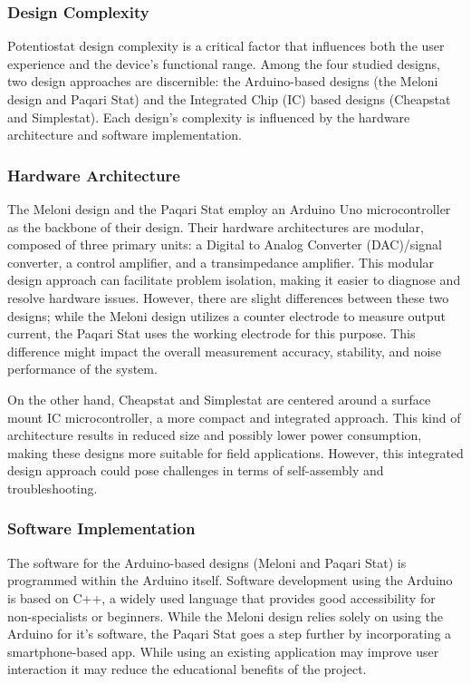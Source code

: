 \documentclass{article}
\begin{document}
\subsubsection*{Design Complexity}
Potentiostat design complexity is a critical factor that influences both the user experience and the device's functional range. Among the four studied designs, two design approaches are discernible: the Arduino-based designs (the Meloni design and Paqari Stat) and the Integrated Chip (IC) based designs (Cheapstat and Simplestat). Each design's complexity is influenced by the hardware architecture and software implementation.

\subsubsection*{Hardware Architecture}
The Meloni design and the Paqari Stat employ an Arduino Uno microcontroller as the backbone of their design. Their hardware architectures are modular, composed of three primary units: a Digital to Analog Converter (DAC)/signal converter, a control amplifier, and a transimpedance amplifier. This modular design approach can facilitate problem isolation, making it easier to diagnose and resolve hardware issues. However, there are slight differences between these two designs; while the Meloni design utilizes a counter electrode to measure output current, the Paqari Stat uses the working electrode for this purpose. This difference might impact the overall measurement accuracy, stability, and noise performance of the system. 

On the other hand, Cheapstat and Simplestat are centered around a surface mount IC microcontroller, a more compact and integrated approach. This kind of architecture results in reduced size and possibly lower power consumption, making these designs more suitable for field applications. However, this integrated design approach could pose challenges in terms of self-assembly and troubleshooting.

\subsubsection*{Software Implementation}
The software for the Arduino-based designs (Meloni and Paqari Stat) is programmed within the Arduino itself. Software development using the Arduino is based on C++, a widely used language that provides good accessibility for non-specialists or beginners. While the Meloni design relies solely on using the Arduino for it's software, the Paqari Stat goes a step further by incorporating a smartphone-based app. While using an existing application may improve user interaction it may reduce the educational benefits of the project.
\end{document}
